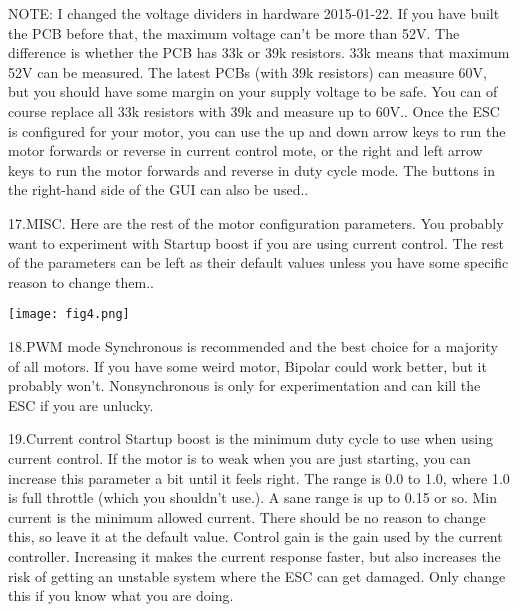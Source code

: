 \documentclass[11pt]{article}
\begin{document}
NOTE: I changed the voltage dividers in hardware 2015-01-22. If you have built the PCB before that, the maximum voltage can’t be more than 52V. The difference is whether the PCB has 33k or 39k resistors. 33k means that maximum 52V can be measured. The latest PCBs (with 39k resistors) can measure 60V, but you should have some margin on your supply voltage to be safe. You can of course replace all 33k resistors with 39k and measure up to 60V..\newline
Once the ESC is configured for your motor, you can use the up and down arrow keys to run the motor forwards or reverse in current control mote, or the right and left arrow keys to run the motor forwards and reverse in duty cycle mode. The buttons in the right-hand side of the GUI can also be used..\newline

17.MISC.\newline
Here are the rest of the motor configuration parameters. You probably want to experiment with Startup boost if you are using current control. The rest of the parameters can be left as their default values unless you have some specific reason to change them..\newline
\begin {center}
\texttt{[image: fig4.png]}\newline

\end{center}

18.PWM mode\newline
Synchronous is recommended and the best choice for a majority of all motors. If you have some weird motor, Bipolar could work better, but it probably won’t. Nonsynchronous is only for experimentation and can kill the ESC if you are unlucky.\newline

19.Current control\newline
Startup boost is the minimum duty cycle to use when using current control. If the motor is to weak when you are just starting, you can increase this parameter a bit until it feels right. The range is 0.0 to 1.0, where 1.0 is full throttle (which you shouldn’t use.). A sane range is up to 0.15 or so.\newline
Min current is the minimum allowed current. There should be no reason to change this, so leave it at the default value.\newline
Control gain is the gain used by the current controller. Increasing it makes the current response faster, but also increases the risk of getting an unstable system where the ESC can get damaged. Only change this if you know what you are doing.\newline
\end{document}
